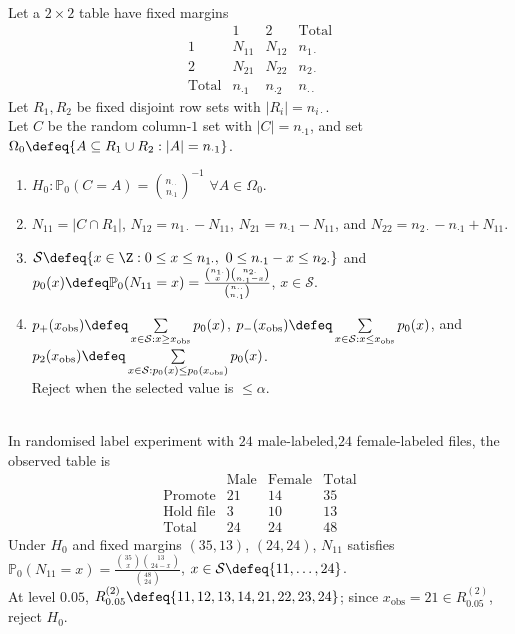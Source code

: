 \begin{method} \label{meth:fishers-exact-test-fixed-margins} \\
Let a $2\times2$ table have fixed margins
\[
\begin{array}{c|cc|c}
&1&2&\text{Total}\\ \hline
1&N_{11}&N_{12}&n_{1\cdot}\\
2&N_{21}&N_{22}&n_{2\cdot}\\ \hline
\text{Total}&n_{\cdot1}&n_{\cdot2}&n_{\cdot\cdot}
\end{array}
\]
Let $R_1,R_2$ be fixed disjoint row sets with $|R_i|=n_{i\cdot}$.\\
Let $C$ be the random column-$1$ set with $|C|=n_{\cdot1}$, and set $\Omega_0\defeq\{A\subseteq R_1\cup R_2:|A|=n_{\cdot1}\}$.
\begin{enumerate}[label=(\roman*)]
\setlength{\itemsep}{0pt}
\item $H_0:\mathbb{P}_0(C=A)=\binom{n_{\cdot\cdot}}{n_{\cdot1}}^{-1}$ $\forall A\in\Omega_0$.
\item $N_{11}=|C\cap R_1|$, $N_{12}=n_{1\cdot}-N_{11}$, $N_{21}=n_{\cdot1}-N_{11}$, and $N_{22}=n_{2\cdot}-n_{\cdot1}+N_{11}$.
\item $\mathcal{S}\defeq\{x\in\Z:0\leq x\leq n_{1\cdot},\ 0\leq n_{\cdot1}-x\leq n_{2\cdot}\}$ and $p_0(x)\defeq\mathbb{P}_{0}(N_{11}=x)=\frac{\binom{n_{1\cdot}}{x}\binom{n_{2\cdot}}{n_{\cdot1}-x}}{\binom{n_{\cdot\cdot}}{n_{\cdot1}}}$, $x\in\mathcal{S}$.
\item $p_+(x_{\mathrm{obs}})\defeq\sum\limits_{x\in\mathcal{S}:x\geq x_{\mathrm{obs}}}p_0(x)$, $p_-(x_{\mathrm{obs}})\defeq\sum\limits_{x\in\mathcal{S}:x\leq x_{\mathrm{obs}}}p_0(x)$, and $p_2(x_{\mathrm{obs}})\defeq\sum\limits_{x\in\mathcal{S}:p_0(x)\leq p_0(x_{\mathrm{obs}})}p_0(x)$.\\
Reject when the selected value is $\leq\alpha$.
\end{enumerate}
\end{method}

\begin{example} \label{ex:promotion-fishers-exact-test} \\
In randomised label experiment with $24$ male-labeled,$24$ female-labeled files, the observed table is
\[
\begin{array}{c|cc|c}
&\text{Male}&\text{Female}&\text{Total}\\ \hline
\text{Promote}&21&14&35\\
\text{Hold file}&3&10&13\\ \hline
\text{Total}&24&24&48
\end{array}
\]
Under $H_0$ and fixed margins $(35,13)$, $(24,24)$, $N_{11}$ satisfies $\mathbb{P}_{0}(N_{11}=x)=\frac{\binom{35}{x}\binom{13}{24-x}}{\binom{48}{24}}$, $x\in\mathcal{S}\defeq\{11,\ldots,24\}$.\\
At level $0.05$, $R_{0.05}^{(2)}\defeq\{11,12,13,14,21,22,23,24\}$; since $x_{\mathrm{obs}}=21\in R_{0.05}^{(2)}$, reject $H_0$.
\end{example}

